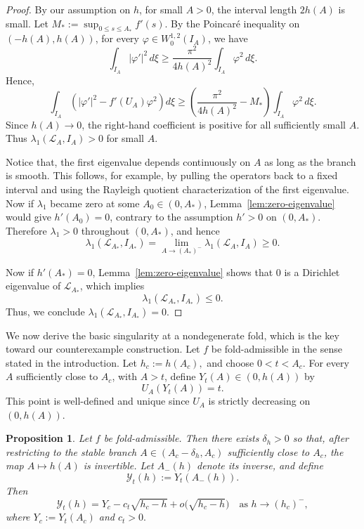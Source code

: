 \documentclass[reqno,12pt]{amsart}
\numberwithin{equation}{section}
\newtheorem{proposition}[theorem]{Proposition}
\theoremstyle{remark}
\begin{document}
\begin{proof}
By our assumption on $h$, for small $A>0$, the interval length $2h(A)$ is small.  Let 
$M_*:=\sup_{0\le s\le A_*}f'(s)$.  
By the Poincar\'e inequality on
$(-h(A),h(A))$, for every $\varphi\in W^{1,2}_0(I_A)$, we have
$$
\int_{I_A}|\varphi'|^2\,d\xi
\ge \frac{\pi^2}{4h(A)^2}\int_{I_A}\varphi^2\,d\xi.
$$
Hence, 
$$
\int_{I_A}\left(|\varphi'|^2-f'(U_A)\varphi^2\right)d\xi
\ge \left(\frac{\pi^2}{4h(A)^2}-M_*\right) \int_{I_A}\varphi^2\,d\xi.
$$
Since $h(A)\to 0$, the right-hand coefficient is positive for all sufficiently small $A$.  Thus $\lambda_1(\mathcal L_A,I_A)>0$ for small $A$.

Notice that, the first eigenvalue depends continuously on $A$ as long as the branch is smooth. This follows, for example, by pulling the operators back to a fixed interval and using the Rayleigh quotient characterization of the first eigenvalue.  Now if $\lambda_1$ became zero at some
$A_0\in(0,A_*)$, Lemma~\ref{lem:zero-eigenvalue} would give $h'(A_0)=0$, 
contrary to the assumption $h'>0$ on $(0,A_*)$.  Therefore
$\lambda_1>0$ throughout $(0,A_*)$, and hence
$$\lambda_1(\mathcal L_{A_*}, I_{A_*})= \lim_{A\to (A_*)^-}\lambda_1(\mathcal L_{A},I_{A})\ge 0.$$

Now if $h'(A_*)=0$, Lemma~\ref{lem:zero-eigenvalue} shows that $0$ is a Dirichlet eigenvalue of $\mathcal L_{A_*}$, which implies
$$\lambda_1(\mathcal L_{A_*}, I_{A_*})\le 0.$$
Thus, we conclude
$\lambda_1(\mathcal L_{A_*},I_{A_*})=0$.
\end{proof}

 

We now derive the basic singularity at a nondegenerate fold, which is the key toward our counterexample construction.  Let $f$ be fold-admissible in the sense stated in the introduction.  Let
$ h_c:=h(A_c), $ and choose  $0<t<A_c.$
For every $A$ sufficiently close to $A_c$, with $A>t$, define
$Y_t(A)\in(0,h(A))$ by
$$
U_A(Y_t(A))=t.
$$
This point is well-defined and unique since $U_A$ is strictly decreasing on
$(0,h(A))$.


\begin{proposition} \label{prop:sqrt-response}
Let $f$ be fold-admissible.  Then there exists $\delta_h>0$ so that, after restricting to the stable branch
$A\in(A_c-\delta_h, A_c)$ sufficiently close to $A_c$, the   map $A\mapsto h(A)$ is
invertible.  Let $A_-(h)$ denote its inverse, and define
$$
\mathcal Y_t(h):=Y_t(A_-(h)).
$$
Then
$$
\mathcal Y_t(h)=Y_c-c_t\sqrt{h_c-h}+o\bigl(\sqrt{h_c-h}\bigr)
\quad\text{as }h\to (h_c)^-,
$$
where $Y_c:=Y_t(A_c)$ and $c_t>0.$
\end{proposition}
\end{document}
